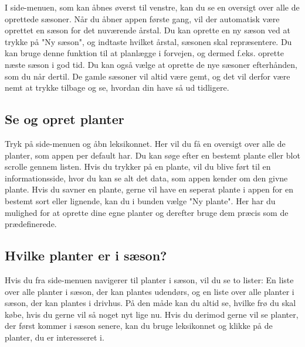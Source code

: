 \begin{minipage}{0.55\textwidth}
I side-menuen, som kan åbnes øverst til venstre, kan du se en oversigt over alle de oprettede sæsoner. Når du åbner appen første gang, vil der automatisk være oprettet en sæson for det nuværende årstal. Du kan oprette en ny sæson ved at trykke på "Ny sæson", og indtaste hvilket årstal, sæsonen skal repræsentere. Du kan bruge denne funktion til at planlægge i forvejen, og dermed f.eks. oprette næste sæson i god tid. Du kan også vælge at oprette de nye sæsoner efterhånden, som du når dertil. De gamle sæsoner vil altid være gemt, og det vil derfor være nemt at trykke tilbage og se, hvordan din have så ud tidligere.
\end{minipage} 

\subsection{Se og opret planter}
Tryk på side-menuen og åbn leksikonnet. Her vil du få en oversigt over alle de planter, som appen per default har. Du kan søge efter en bestemt plante eller blot scrolle gennem listen. Hvis du trykker på en plante, vil du blive ført til en informationsside, hvor du kan se alt det data, som appen kender om den givne plante. Hvis du savner en plante, gerne vil have en seperat plante i appen for en bestemt sort eller lignende, kan du i bunden vælge "Ny plante". Her har du mulighed for at oprette dine egne planter og derefter bruge dem præcis som de prædefinerede.

\subsection{Hvilke planter er i sæson?}
Hvis du fra side-menuen navigerer til planter i sæson, vil du se to lister: En liste over alle planter i sæson, der kan plantes udendørs, og en liste over alle planter i sæson, der kan plantes i drivhus. På den måde kan du altid se, hvilke frø du skal købe, hvis du gerne vil så noget nyt lige nu. 
Hvis du derimod gerne vil se planter, der først kommer i sæson senere, kan du bruge leksikonnet og klikke på de planter, du er interesseret i.

